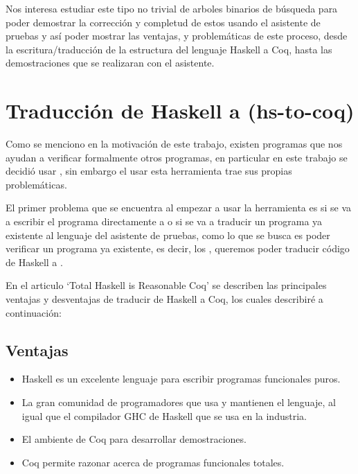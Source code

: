 Nos interesa estudiar este tipo no trivial de arboles binarios de búsqueda para poder demostrar la
correcci\'on y completud de estos usando el asistente de pruebas {\coq} y así poder mostrar las
ventajas, y problemáticas de este proceso, desde la escritura/traducción de la estructura del
lenguaje Haskell a Coq, hasta las demostraciones que se realizaran con el asistente.

\section{Traducción de Haskell a {\coq} (hs-to-coq)}
Como se menciono en la motivación de este trabajo, existen programas que nos ayudan a verificar
formalmente otros programas, en particular en este trabajo se decidió usar {\coq}, sin embargo el
usar esta herramienta trae sus propias problemáticas.

El primer problema que se encuentra al empezar a usar la herramienta es si se va a escribir el
programa directamente a {\coq} o si se va a traducir un programa ya existente al lenguaje del
asistente de pruebas, como lo que se busca es poder verificar un programa ya existente, es decir,
los {\arns}, queremos poder traducir código de Haskell a {\coq}.

En el articulo `Total Haskell is Reasonable Coq' \cite{thrc} se describen las principales
ventajas y desventajas de traducir de Haskell a Coq, los cuales describiré a continuaci\'on:

\subsection{Ventajas}
\begin{itemize}
    \item Haskell es un excelente lenguaje para escribir programas funcionales puros.
    \item La gran comunidad de programadores que usa y mantienen el lenguaje, al igual que el
    compilador GHC de Haskell que se usa en la industria.
    \item El ambiente de Coq para desarrollar demostraciones.
    \item Coq permite razonar acerca de programas funcionales totales.
\end{itemize}

